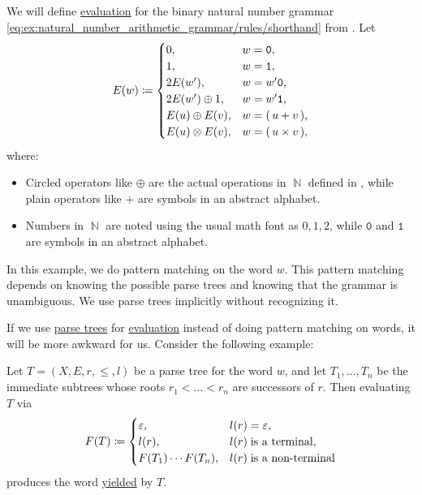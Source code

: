 \begin{example}\label{ex:natural_number_arithmetic_grammar/evaluation}
  We will define \hyperref[rem:evaluation]{evaluation} for the binary natural number grammar \eqref{eq:ex:natural_number_arithmetic_grammar/rules/shorthand} from . Let
  \begin{equation*}
    E(w) \coloneqq \begin{cases}
      0,                 &w = \mathtt{0}, \\
      1,                 &w = \mathtt{1}, \\
      2 E(w'),           &w = w' \mathtt{0}, \\
      2 E(w') \oplus 1,  &w = w' \mathtt{1}, \\
      E(u) \oplus E(v),  &w = \mathtt{(} \thinspace u + v \thinspace \mathtt{)}, \\
      E(u) \otimes E(v), &w = \mathtt{(} \thinspace u \times v \thinspace \mathtt{)},
    \end{cases}
  \end{equation*}
  where:
  \begin{itemize}
    \item Circled operators like \( \oplus \) are the actual operations in \( \BbbN \) defined in , while plain operators like \( + \) are symbols in an abstract alphabet.
    \item Numbers in \( \BbbN \) are noted using the usual math font as \( 0, 1, 2 \), while \( \mathtt{0} \) and \( \mathtt{1} \) are symbols in an abstract alphabet.
  \end{itemize}

  In this example, we do pattern matching on the word \( w \). This pattern matching depends on knowing the possible parse trees and knowing that the grammar is unambiguous. We use parse trees implicitly without recognizing it.
\end{example}

\begin{example}\label{ex:evaluation_via_trees}
  If we use \hyperref[def:parse_tree]{parse trees} for \hyperref[rem:evaluation]{evaluation} instead of doing pattern matching on words, it will be more awkward for us. Consider the following example:

  Let \( T = (X, E, r, \leq, l) \) be a parse tree for the word \( w \), and let \( T_1, \ldots, T_n \) be the immediate subtrees whose roots \( r_1 < \ldots < r_n \) are successors of \( r \). Then evaluating \( T \) via
  \begin{equation*}
    F(T) \coloneqq \begin{cases}
      \varepsilon,          &l(r) = \varepsilon, \\
      l(r),                 &l(r) \T{is a terminal}, \\
      F(T_1) \cdots F(T_n), &l(r) \T{is a non-terminal}
    \end{cases}
  \end{equation*}
  produces the word \hyperref[def:parse_tree_word]{yielded} by \( T \).
\end{example}

